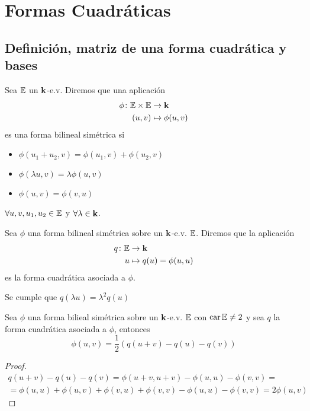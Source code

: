 
\section{Formas Cuadráticas}

\subsection{Definición, matriz de una forma cuadrática y bases}

\begin{defi}
	Sea $\mathbb{E}$ un $\mathbf{k}$-e.v. Diremos que una aplicación
	\[
		\begin{aligned}
			\phi \colon \mathbb{E} \times \mathbb{E} &\to \mathbf{k} \\
			(u,v) &\mapsto \phi(u,v)
		\end{aligned}
	\]
	es una forma bilineal simétrica si \begin{itemize}
		\item $\phi(u_1 + u_2, v) = \phi(u_1, v) + \phi(u_2, v)$
		\item $\phi(\lambda u, v) = \lambda\phi(u,v)$
		\item $\phi(u,v) = \phi(v,u)$
	\end{itemize}
	$\forall u,v,u_1,u_2 \in \mathbb{E}$ y $\forall \lambda \in \mathbf{k}$.
\end{defi}
\begin{defi}
	Sea $\phi$ una forma bilineal simétrica sobre un $\mathbf{k}$-e.v. $\mathbb{E}$.
	Diremos que la aplicación
	\[
		\begin{aligned}
			q \colon \mathbb{E} &\to \mathbf{k} \\
			u &\mapsto q(u) = \phi(u,u)
		\end{aligned}
	\]
	es la forma cuadrática asociada a $\phi$.
\end{defi}
\begin{obs}
	Se cumple que $q(\lambda u) = \lambda^2 q(u)$
\end{obs}
\begin{lema}
	Sea $\phi$ una forma bilieal simétrica sobre un $\mathbf{k}$-e.v. $\mathbb{E}$ con $\operatorname{car} \mathbb{E} \neq 2$
	y sea $q$ la forma cuadrática asociada a $\phi$, entonces
	\[
		\phi(u,v) = \frac{1}{2} ( q(u+v) - q(u) - q(v))
	\]
\end{lema}
\begin{proof}
	\[
	\begin{split}
		q(u+v) - q(u) - q(v) = \phi(u+v,u+v) - \phi(u,u) - \phi(v,v) = \\
		=\phi(u,u) + \phi(u,v) + \phi(v,u)  + \phi(v,v) - \phi(u,u) - \phi(v,v) =
		2 \phi(u,v)
	\end{split}
	\]
\end{proof}

